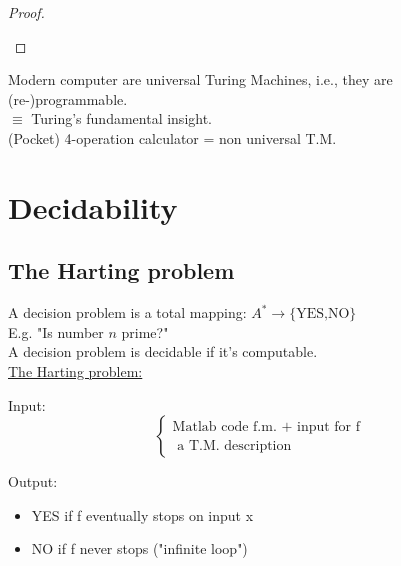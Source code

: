 \begin{proof}
\begin{itemize}
\begin{center}
\end{center}
\end{itemize}
\end{proof}
Modern computer are universal Turing Machines, i.e., they are (re-)programmable.\\
$\equiv$ Turing's fundamental insight.\\
(Pocket) 4-operation calculator = non universal T.M.

\section{Decidability}

\subsection{The Harting problem}
A decision problem is a total mapping: $A^*\rightarrow \{\text{YES,NO}\}$\\
E.g. "Is number $n$ prime?"\\
A decision problem is decidable if it's computable.\\

\underline{The Harting problem:}\\
\begin{leftbar}
Input:\begin{equation}
  \left\{
    \begin{split}
    \text{Matlab code f.m. + input for f}\\ 
    \text{ a T.M. description}
    \end{split}
  \right.
\end{equation}

Output:
\begin{itemize}
\item YES if f eventually stops on input x
\item NO if f never stops ("infinite loop")
\end{itemize}
\end{leftbar}